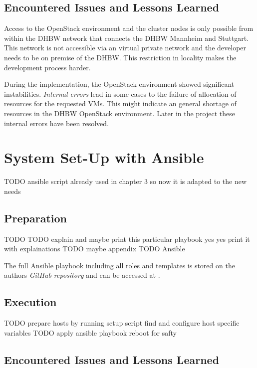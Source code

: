 \subsection{Encountered Issues and Lessons Learned}

Access to the OpenStack environment and the cluster nodes is only possible from within the \ac{DHBW} network that connects the \ac{DHBW} Mannheim and Stuttgart.
This network is not accessible via an virtual private network and the developer needs to be on premise of the \ac{DHBW}. This restriction in locality makes the development process harder.

During the implementation, the OpenStack environment showed significant instabilities.
\emph{Internal errors} lead in some cases to the failure of allocation of resources for the requested \acp{VM}.
This might indicate an general shortage of resources in the \ac{DHBW} OpenStack environment. Later in the project these internal errors have been resolved.

\section{System Set-Up with Ansible}

TODO ansible script already used in chapter 3 so now it is adapted to the new needs

\subsection{Preparation}

TODO
TODO explain and maybe print this particular playbook yes yes print it with explainations
TODO maybe appendix
TODO Ansible


The full Ansible playbook including all roles and templates is stored on the authors \emph{GitHub repository} and can be accessed at 
.

     


\subsection{Execution}


TODO prepare hosts by running setup script
find and configure host specific variables
TODO apply ansible playbook
reboot for safty

\subsection{Encountered Issues and Lessons Learned}

